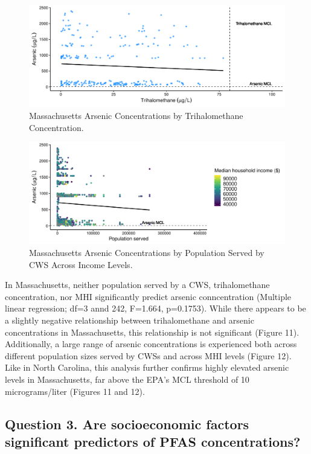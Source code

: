 \documentclass[12pt,]{article}
\begin{document}
\begin{figure}
\centering
\includegraphics{Project_Template_files/figure-latex/figs11-1.pdf}
\caption{Massachusetts Arsenic Concentrations by Trihalomethane
Concentration.}
\end{figure}

\begin{figure}
\centering
\includegraphics{Project_Template_files/figure-latex/figs12-1.pdf}
\caption{Massachusetts Arsenic Concentrations by Population Served by
CWS Across Income Levels.}
\end{figure}

In Massachusetts, neither population served by a CWS, trihalomethane
concentration, nor MHI significantly predict arsenic conncentration
(Multiple linear regression; df=3 annd 242, F=1.664, p=0.1753). While
there appears to be a slightly negative relationship between
trihalomethane and arsenic concentrations in Massachusetts, this
relationship is not significant (Figure 11). Additionally, a large range
of arsenic concentrations is experienced both across different
population sizes served by CWSs and across MHI levels (Figure 12). Like
in North Carolina, this analysis further confirms highly elevated
arsenic levels in Massachusetts, far above the EPA's MCL threshold of 10
micrograms/liter (Figures 11 and 12).

\newpage

\hypertarget{question-3.-are-socioeconomic-factors-significant-predictors-of-pfas-concentrations}{%
\subsection{Question 3. Are socioeconomic factors significant predictors
of PFAS
concentrations?}\label{question-3.-are-socioeconomic-factors-significant-predictors-of-pfas-concentrations}}
\end{document}
